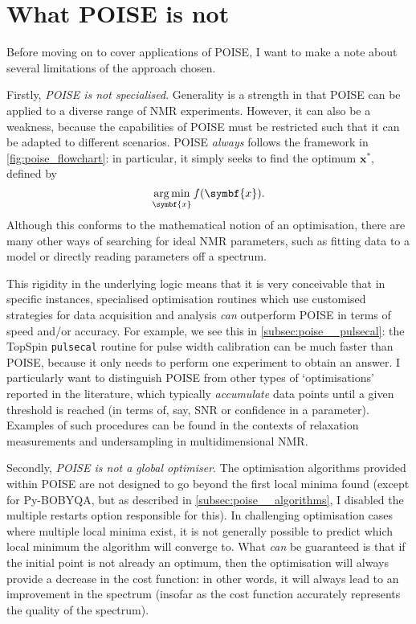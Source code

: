 \section{What POISE is not}
\label{sec:poise__notpoise}

Before moving on to cover applications of POISE, I want to make a note about several limitations of the approach chosen. 

Firstly, \textit{POISE is not specialised}.
Generality is a strength in that POISE can be applied to a diverse range of NMR experiments.
However, it can also be a weakness, because the capabilities of POISE must be restricted such that it can be adapted to different scenarios.
POISE \textit{always} follows the framework in \cref{fig:poise_flowchart}: in particular, it simply seeks to find the optimum $\symbf{x}^*$, defined by
\begin{equation}
    \label{eq:poise_argmin}
    \argmin_{\symbf{x}} f(\symbf{x}).
\end{equation}
Although this conforms to the mathematical notion of an optimisation, there are many other ways of searching for ideal NMR parameters, such as fitting data to a model or directly reading parameters off a spectrum.

This rigidity in the underlying logic means that it is very conceivable that in specific instances, specialised optimisation routines which use customised strategies for data acquisition and analysis \textit{can} outperform POISE in terms of speed and/or accuracy.
For example, we see this in \cref{subsec:poise__pulsecal}: the TopSpin \texttt{pulsecal} routine for pulse width calibration can be much faster than POISE, because it only needs to perform one experiment to obtain an answer.
I particularly want to distinguish POISE from other types of `optimisations' reported in the literature, which typically \textit{accumulate} data points until a given threshold is reached (in terms of, say, SNR or confidence in a parameter).
Examples of such procedures can be found in the contexts of relaxation measurements\autocite{Song2018JMR,Tang2019SR} and undersampling in multidimensional NMR\autocite{Eghbalnia2005JACS,Hansen2016ACIE,BrukerSmartDriveNMR}.

Secondly, \textit{POISE is not a global optimiser}.
The optimisation algorithms provided within POISE are not designed to go beyond the first local minima found (except for Py-BOBYQA, but as described in \cref{subsec:poise__algorithms}, I disabled the multiple restarts option responsible for this).
In challenging optimisation cases where multiple local minima exist, it is not generally possible to predict which local minimum the algorithm will converge to.
What \textit{can} be guaranteed is that if the initial point is not already an optimum, then the optimisation will always provide a decrease in the cost function: in other words, it will always lead to an improvement in the spectrum (insofar as the cost function accurately represents the quality of the spectrum).

